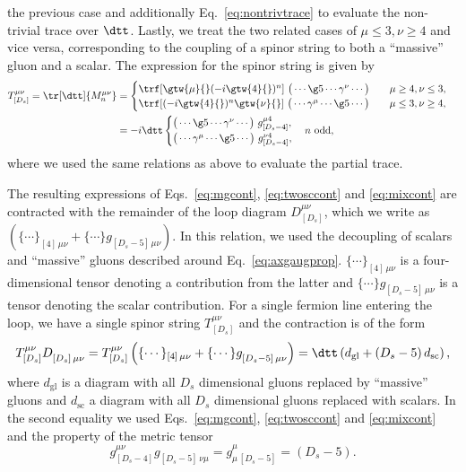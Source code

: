 the previous case and additionally Eq.~\eqref{eq:nontrivtrace} to evaluate the
non-trivial trace over $\dtt$. Lastly, we treat the two related cases
of $\mu \leq 3, \nu \geq 4$ and vice versa, corresponding to the
coupling of a spinor string to both a ``massive'' gluon and a
scalar. The expression for the spinor string is given by
\begin{subequations}
\begin{align}
    T^{\mu\nu}_{[D_s]} = \tr[\dtt]{M^{\mu\nu}_n} &=
\begin{cases}
\trf[\gtw{\mu}{}(-i\gtw{4}{})^n] ~  \big(\cdots \g5\cdots\gamma^{\nu}\cdots\big)\qquad\mu \geq 4, \nu \leq 3,\\
\trf[(-i\gtw{4}{})^n\gtw{\nu}{}] ~ \big(\cdots
\gamma^{\mu}\cdots\g5\cdots\big)\qquad \mu \leq 3, \nu \geq 4,
\end{cases}\\\label{eq:mixcont}
&=-i\dtt 
\begin{cases}
  \big(\cdots
\g5\cdots\gamma^{\nu}\cdots\big) ~ g_{[D_s-4]}^{\mu 4 },\\
\big(\cdots \gamma^{\mu}\cdots\g5\cdots\big) ~ g_{[D_s-4]}^{\nu 4 },
\end{cases}n\text{ odd},
\end{align}
\end{subequations}
where we used the same relations as above to evaluate the partial
trace. 

The resulting expressions of Eqs.~\eqref{eq:mgcont}, \eqref{eq:twosccont} and \eqref{eq:mixcont} are contracted
with the remainder of the loop diagram $D^{\mu\nu}_{[D_s]}$, which we
write as $( \{\cdots\}_{[4]\,\mu\nu} +
\{\cdots\}g^{\phantom{\mu}}_{[D_s-5]\,\mu\nu} )$. In this relation, we used the decoupling
of scalars and ``massive'' gluons described around Eq.~\eqref{eq:axgaugprop}. $\{\cdots\}_{[4]\,\mu\nu}$ is a four-dimensional tensor
denoting a contribution from the latter and
$\{\cdots\}g^{\phantom{\mu}}_{[D_s-5]\,\mu\nu}$ is a tensor
denoting the scalar contribution. For a
single fermion line entering the loop, we have a single spinor string
$T^{\mu\nu}_{[D_s]}$ and the contraction is of the form
\begin{equation} \label{eq:contr1}
  T^{\mu\nu}_{[D_s]} D^{\phantom{\mu}}_{[D_s]\,\mu\nu} = 
  T^{\mu\nu}_{[D_s]}\left( \{\cdots\}_{[4]\,\mu\nu} + \{\cdots\}g^{\phantom{\mu}}_{[D_s-5]\,\mu\nu} \right)= 
  \dtt\left( d_{\text{gl}} + (D_s-5)\,d_{\text{sc}}  \right),
\end{equation}
where $d_{\text{gl}}$ is a diagram with all $D_s$ dimensional gluons
replaced by ``massive'' gluons and $d_{\text{sc}}$ a diagram with all
$D_s$ dimensional gluons replaced with scalars. In the second equality
we used Eqs.~\eqref{eq:mgcont}, \eqref{eq:twosccont} and
\eqref{eq:mixcont} and the property of the metric tensor
\begin{equation} \label{eq:metrconr}
  g^{\mu\nu}_{[D_s-4]}g_{[D_s-5]\,\nu\mu}^{\phantom{\mu}}=g^\mu_{\mu\,[D_s-5]}=(D_s-5).
\end{equation}

